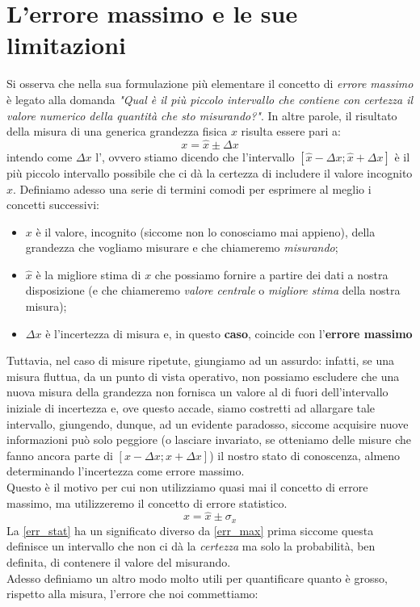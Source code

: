 \documentclass{report}
\begin{document}
	\section{L'errore massimo e le sue limitazioni}
	Si osserva che nella sua formulazione più elementare il concetto di \emph{errore massimo} è legato alla domanda \emph{"Qual è il più piccolo intervallo che contiene con certezza il valore numerico della quantità che sto misurando?"}. In altre parole, il risultato della misura di una generica grandezza fisica $x$ risulta essere pari a:
	\begin{equation}
		x = \hat{x} \pm \Delta x
		\label{err_max}
	\end{equation}
	intendo come $\Delta x$ l', ovvero stiamo dicendo che l'intervallo $[\hat{x} - \Delta x; \hat{x} + \Delta x]$ è il più piccolo intervallo possibile che ci dà la certezza di includere il valore incognito $x$. Definiamo adesso una serie di termini comodi per esprimere al meglio i concetti successivi:
	\begin{itemize}
		\item $x$ è il valore, incognito (siccome non lo conosciamo mai appieno), della grandezza che vogliamo misurare e che chiameremo \emph{misurando};
		\item $\hat{x}$ è la migliore stima di $x$ che possiamo fornire a partire dei dati a nostra disposizione (e che chiameremo \emph{valore centrale} o \emph{migliore stima} della nostra misura);
		\item $\Delta x$ è l'incertezza di misura e, in questo \textbf{caso}, coincide con l'\textbf{errore massimo}
	\end{itemize}
	Tuttavia, nel caso di misure ripetute, giungiamo ad un assurdo: infatti, se una misura fluttua, da un punto di vista operativo, non possiamo escludere che una nuova misura della grandezza non fornisca un valore al di fuori dell'intervallo iniziale di incertezza e, ove questo accade, siamo costretti ad allargare tale intervallo, giungendo, dunque, ad un evidente paradosso, siccome acquisire nuove informazioni può solo peggiore (o lasciare invariato, se otteniamo delle misure che fanno ancora parte di $[x-\Delta x; x + \Delta x]$) il nostro stato di conoscenza, almeno determinando l'incertezza come errore massimo. \\
	Questo è il motivo per cui non utilizziamo quasi mai il concetto di errore massimo, ma utilizzeremo il concetto di errore statistico.
	\begin{equation}
		x = \hat{x} \pm \sigma_x
		\label{err_stat}
	\end{equation}
	La \ref{err_stat} ha un significato diverso da \ref{err_max} prima siccome questa definisce un intervallo che non ci dà la \emph{certezza} ma solo la probabilità, ben definita, di contenere il valore del misurando. \\
	Adesso definiamo un altro modo molto utili per quantificare quanto è grosso, rispetto alla misura, l'errore che noi commettiamo:
\end{document}
